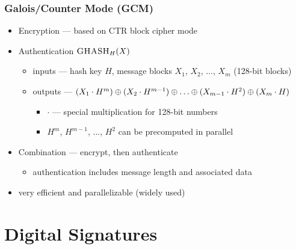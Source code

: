 \documentclass[final]{article}
\begin{document}
\subsubsection{Galois/Counter Mode (GCM)}
\begin{itemize}[nosep]
    \item Encryption --- based on CTR block cipher mode
    \item Authentication $\textproc{GHASH}_H(X)$
          \begin{itemize}[nosep]
              \item inputs --- hash key $H$, message blocks $X_1$, $X_2$, $\dots$, $X_m$ (128-bit blocks)
              \item outputs --- $(X_1\cdot H^m) \xor (X_2\cdot H^{m-1}) \xor \dots \xor (X_{m-1}\cdot H^2) \xor (X_m\cdot H)$
                    \begin{itemize}[nosep]
                        \item $\cdot$ --- special multiplication for 128-bit numbers
                        \item $H^m$, $H^{m-1}$, $\dots$, $H^2$ can be precomputed in parallel
                    \end{itemize}
          \end{itemize}
    \item Combination --- encrypt, then authenticate
          \begin{itemize}[nosep]
              \item authentication includes message length and associated data
          \end{itemize}
    \item very efficient and parallelizable (widely used)
\end{itemize}
\section{Digital Signatures}
\end{document}
